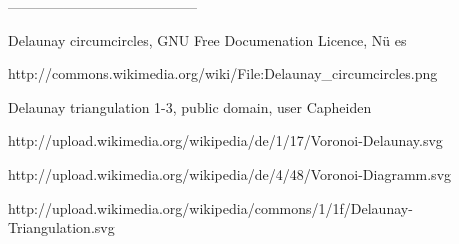 \documentclass[a4paper,12pt]{article}
\begin{document}
-----------------------------------------


Delaunay circumcircles, GNU Free Documenation Licence, Nü es

http://commons.wikimedia.org/wiki/File:Delaunay\_circumcircles.png


Delaunay triangulation 1-3, public domain, user Capheiden 

http://upload.wikimedia.org/wikipedia/de/1/17/Voronoi-Delaunay.svg

http://upload.wikimedia.org/wikipedia/de/4/48/Voronoi-Diagramm.svg

http://upload.wikimedia.org/wikipedia/commons/1/1f/Delaunay-Triangulation.svg
\end{document}
